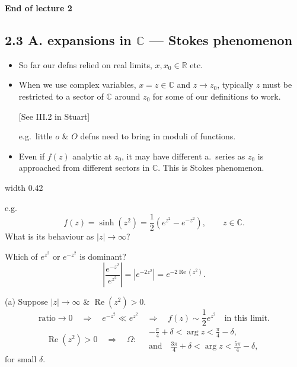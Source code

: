 \documentclass[11pt,a4paper]{article}
\begin{document}
\begin{center}
\textbf{End of lecture 2}
\end{center}

\subsection*{2.3 A. expansions in $\mathbb{C}$ --- Stokes phenomenon}

\begin{itemize}
    \item So far our defns relied on real limits, $x,x_0\in\mathbb{R}$ etc.
    \item When we use complex variables, $x=z\in\mathbb{C}$ and $z\to z_0$,
    typically $z$ must be restricted to a sector of $\mathbb{C}$ around $z_0$
    for some of our definitions to work.

    [See III.2 in Stuart]

    e.g.\ little $o$ \& $O$ defns need to bring in moduli of functions.
    \item Even if $f(z)$ analytic at $z_0$, it may have different a.\ series
    as $z_0$ is approached from different sectors in $\mathbb{C}$.
    This is Stokes phenomenon.
\end{itemize}

\begin{center}
    \pdfximage width 0.42\linewidth {figures/asymptotic-lecture3-sectors.png}
    \pdfrefximage\pdflastximage
\end{center}

e.g.
\[
    f(z)=\sinh(z^2)=\frac{1}{2}\left(e^{z^2}-e^{-z^2}\right),
    \qquad z\in\mathbb{C}.
\]
What is its behaviour as $|z|\to\infty$?

Which of $e^{z^2}$ or $e^{-z^2}$ is dominant?
\[
    \left|\frac{e^{-z^2}}{e^{z^2}}\right|
    =\left|e^{-2z^2}\right|=e^{-2\operatorname{Re}(z^2)}.
\]

\noindent
(a) Suppose $|z|\to\infty$ \& $\operatorname{Re}(z^2)>0$.
\[
    \text{ratio}\to0
    \quad\Rightarrow\quad e^{-z^2}\ll e^{z^2}
    \quad\Rightarrow\quad f(z)\sim\frac{1}{2}e^{z^2}
    \quad\text{in this limit.}
\]
\[
    \operatorname{Re}(z^2)>0
    \quad\Rightarrow\quad
    \Omega:\quad
    \begin{gathered}
        -\frac{\pi}{4}+\delta<\arg z<\frac{\pi}{4}-\delta,\\
        \text{and}\quad
        \frac{3\pi}{4}+\delta<\arg z<\frac{5\pi}{4}-\delta,
    \end{gathered}
\]
for small $\delta$.
\end{document}
